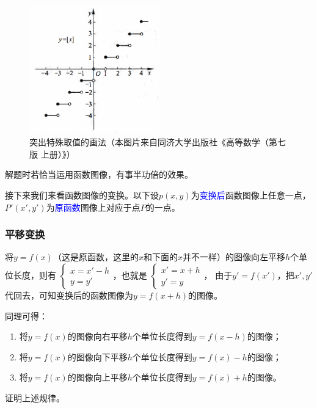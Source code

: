 \documentclass[lang=cn,math=cm,chinesefont=nofont,11pt,scheme=chinese,twocol]{elegantbook}
\begin{document}
\begin{figure}[h]
  \centering
  \includegraphics[width=0.5\textwidth]{image/2.1.5function6.png}
  \caption{突出特殊取值的画法（本图片来自同济大学出版社《高等数学（第七版 上册）》）}
  \label{img:2.1.5function6}
\end{figure}

解题时若恰当运用函数图像，有事半功倍的效果。

接下来我们来看函数图像的变换。以下设$p(x,y)$为\textcolor{blue}{变换后}函数图像上任意一点，$P'(x',y')$为\textcolor{blue}{原函数}图像上对应于点$P$的一点。

\subsubsection{平移变换}

将$y=f(x)$（这是原函数，这里的$x$和下面的$x$并不一样）的图像向左平移$h$个单位长度，则有
$\begin{cases}
  x=x'-h
  \\y=y'
\end{cases}$，也就是
$\begin{cases}
  x'=x+h
  \\y'=y
\end{cases}$，
由于$y'=f(x')$，把$x',y'$代回去，可知变换后的函数图像为$y=f(x+h)$的图像。

同理可得：

\begin{enumerate}
  \item 将$y=f(x)$的图像向右平移$h$个单位长度得到$y=f(x-h)$的图像；
  \item 将$y=f(x)$的图像向下平移$h$个单位长度得到$y=f(x)-h$的图像；
  \item 将$y=f(x)$的图像向上平移$h$个单位长度得到$y=f(x)+h$的图像。
\end{enumerate}

\begin{exercise}
  证明上述规律。
\end{exercise}
\end{document}
